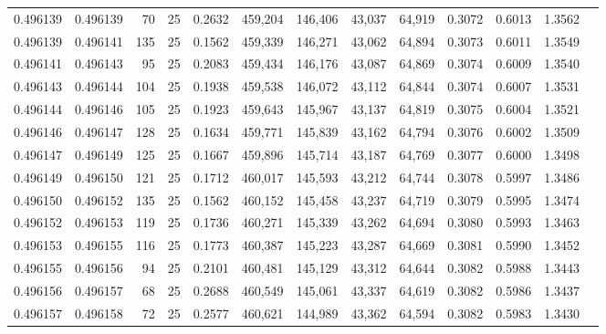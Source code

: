 \begin{tabular}{rrrrrrrrrrrrr}
0.496139 & 0.496139 &    70 &  25 &                                     0.2632 & 459,204 & 146,406 &  43,037 &  64,919 & 0.3072 & 0.6013 & 1.3562 \\
0.496139 & 0.496141 &   135 &  25 &                                     0.1562 & 459,339 & 146,271 &  43,062 &  64,894 & 0.3073 & 0.6011 & 1.3549 \\
0.496141 & 0.496143 &    95 &  25 &                                     0.2083 & 459,434 & 146,176 &  43,087 &  64,869 & 0.3074 & 0.6009 & 1.3540 \\
0.496143 & 0.496144 &   104 &  25 &                                     0.1938 & 459,538 & 146,072 &  43,112 &  64,844 & 0.3074 & 0.6007 & 1.3531 \\
0.496144 & 0.496146 &   105 &  25 &                                     0.1923 & 459,643 & 145,967 &  43,137 &  64,819 & 0.3075 & 0.6004 & 1.3521 \\
0.496146 & 0.496147 &   128 &  25 &                                     0.1634 & 459,771 & 145,839 &  43,162 &  64,794 & 0.3076 & 0.6002 & 1.3509 \\
0.496147 & 0.496149 &   125 &  25 &                                     0.1667 & 459,896 & 145,714 &  43,187 &  64,769 & 0.3077 & 0.6000 & 1.3498 \\
0.496149 & 0.496150 &   121 &  25 &                                     0.1712 & 460,017 & 145,593 &  43,212 &  64,744 & 0.3078 & 0.5997 & 1.3486 \\
0.496150 & 0.496152 &   135 &  25 &                                     0.1562 & 460,152 & 145,458 &  43,237 &  64,719 & 0.3079 & 0.5995 & 1.3474 \\
0.496152 & 0.496153 &   119 &  25 &                                     0.1736 & 460,271 & 145,339 &  43,262 &  64,694 & 0.3080 & 0.5993 & 1.3463 \\
0.496153 & 0.496155 &   116 &  25 &                                     0.1773 & 460,387 & 145,223 &  43,287 &  64,669 & 0.3081 & 0.5990 & 1.3452 \\
0.496155 & 0.496156 &    94 &  25 &                                     0.2101 & 460,481 & 145,129 &  43,312 &  64,644 & 0.3082 & 0.5988 & 1.3443 \\
0.496156 & 0.496157 &    68 &  25 &                                     0.2688 & 460,549 & 145,061 &  43,337 &  64,619 & 0.3082 & 0.5986 & 1.3437 \\
0.496157 & 0.496158 &    72 &  25 &                                     0.2577 & 460,621 & 144,989 &  43,362 &  64,594 & 0.3082 & 0.5983 & 1.3430 \\

\end{tabular}
